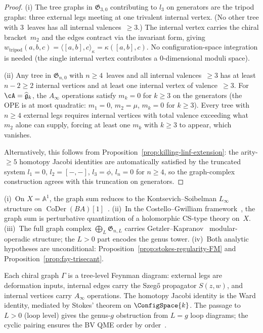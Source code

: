 \begin{proof}
(i)\enspace
The tree graphs in $\mathfrak{G}_{3,0}$ contributing to $l_3$ on
generators are the tripod graphs: three external legs
meeting at one trivalent internal vertex.  (No other tree with
$3$~leaves has all internal valences~$\geq 3$.)
The internal vertex carries the chiral bracket~$m_2$ and the
edges contract via the invariant form, giving
$w_{\text{tripod}}(a,b,c) = \langle [a,b], c \rangle_\kappa
= \kappa([a,b],c)$.
No configuration-space integration is needed (the single internal
vertex contributes a $0$-dimensional moduli space).

(ii)\enspace
Any tree in $\mathfrak{G}_{n,0}$ with $n \geq 4$~leaves
and all internal valences~$\geq 3$ has at least $n - 2 \geq 2$
internal vertices and at least one internal vertex of
valence~$\geq 3$.  For
$\cA = \widehat{\mathfrak{g}}_k$, the $A_\infty$ operations
satisfy $m_k = 0$ for $k \geq 3$ on the generators (the OPE is at
most quadratic: $m_1 = 0$, $m_2 = \mu$, $m_k = 0$ for
$k \geq 3$).  Every tree with $n \geq 4$ external legs requires
internal vertices with total valence exceeding what $m_2$ alone can
supply, forcing at least one $m_k$ with $k \geq 3$ to appear, which
vanishes.

Alternatively, this follows from
Proposition~\ref{prop:killing-linf-extension}: the arity-$\geq 5$
homotopy Jacobi identities are automatically satisfied by the
truncated system $l_1 = 0$, $l_2 = [-,-]$, $l_3 = \phi$,
$l_n = 0$ for $n \geq 4$, so the graph-complex construction
agrees with this truncation on generators.
\end{proof}

\begin{remark}
\label{rem:graph-complex-context}
(i)~On $X = \mathbb{A}^1$, the graph sum reduces to the
Kontsevich--Soibelman $L_\infty$ structure on
$\operatorname{CoDer}(BA)[1]$~\cite{KontsevichSoibelman}.
(ii)~In the Costello--Gwilliam framework~\cite{CG17,CG-vol2}, the
graph sum is perturbative quantization of a holomorphic CS-type
theory on~$X$.
(iii)~The full graph complex
$\bigoplus_L \mathfrak{G}_{n,L}$ carries
Getzler--Kapranov~\cite{GeK98} modular-operadic structure; the
$L > 0$ part encodes the genus tower.
(iv)~Both analytic hypotheses are unconditional:
Proposition~\ref{prop:stokes-regularity-FM} and
Proposition~\ref{prop:fay-trisecant}.
\end{remark}

\begin{remark}\label{rem:graph-complex-physics}
Each chiral graph $\Gamma$ is a tree-level Feynman diagram: external
legs are deformation inputs, internal edges carry the Szeg\H{o}
propagator $S(z,w)$, and internal vertices carry $A_\infty$
operations.  The homotopy Jacobi identity is the Ward identity,
mediated by Stokes' theorem on $\ConfigSpace{k}$.  The passage to
$L > 0$ (loop level) gives the genus-$g$ obstruction from $L = g$
loop diagrams; the cyclic pairing ensures the BV QME order by
order~\cite{costello-renormalization}.
\end{remark}

